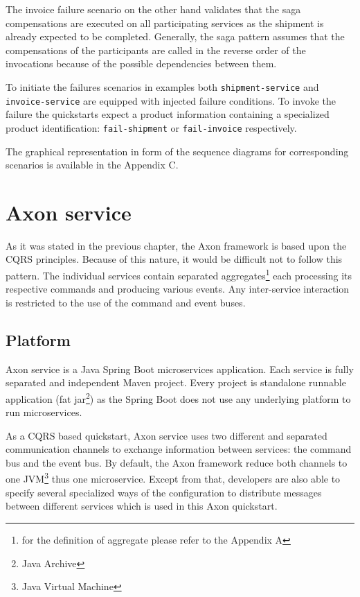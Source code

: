 \documentclass[oneside,
  digital, %
  table,   %
  nolof,     %
  nolot,     %
]{fithesis3}
\begin{document}
The invoice failure scenario on the other hand validates that the saga compensations are executed on all participating services as the shipment is already expected to be completed. Generally, the saga pattern assumes that the compensations of the participants are called in the reverse order of the invocations because of the possible dependencies between them.

To initiate the failures scenarios in examples both \texttt{shipment-service} and \texttt{invoice-service} are equipped with injected failure conditions. To invoke the failure the quickstarts expect a product information containing a specialized product identification: \texttt{fail-shipment} or \texttt{fail-invoice} respectively. 

The graphical representation in form of the sequence diagrams for corresponding scenarios is available in the Appendix C.

\section{Axon service}

As it was stated in the previous chapter, the Axon framework is based upon the CQRS principles. Because of this nature, it would be difficult not to follow this pattern. The individual services contain separated aggregates\footnote{for the definition of aggregate please refer to the Appendix A} each processing its respective commands and producing various events. Any inter-service interaction is restricted to the use of the command and event buses.

\subsection{Platform}

Axon service is a Java Spring Boot microservices application. Each service is fully separated and independent Maven\cite{maven} project. Every project is standalone runnable application (fat jar\footnote{Java Archive}) as the Spring Boot does not use any underlying platform to run microservices.

As a CQRS based quickstart, Axon service uses two different and separated communication channels to exchange information between services: the command bus and the event bus. By default, the Axon framework reduce both channels to one JVM\footnote{Java Virtual Machine} thus one microservice. Except from that, developers are also able to specify several specialized ways of the configuration to distribute messages between different services which is used in this Axon quickstart.
\end{document}
